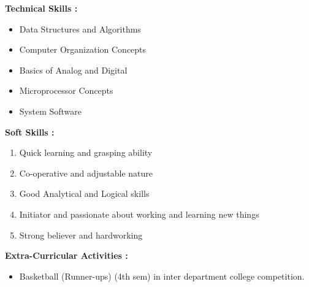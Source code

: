 \documentclass[11pt,a4paper]{article}
\begin{document}
\newpage
\begin{multicols}{3}
	\begin{minipage}{0.15\paperwidth}
		\textbf{Technical\linebreak
		Skills : }
	\end{minipage}
	\begin{minipage}{0.35\paperwidth}
		\begin{flushleft}
		\begin{itemize}
			\item Data Structures and Algorithms
			\item Computer Organization\linebreak
			Concepts
		\end{itemize}
	\end{flushleft}
	\end{minipage}
	\begin{flushright}
	\begin{minipage}{0.35\paperwidth}
		\begin{flushleft}
		\begin{itemize}
			\item Basics of Analog and Digital
			\item Microprocessor Concepts
			\item System Software
		\end{itemize}
		\end{flushleft}
	\end{minipage}
	\end{flushright}
\end{multicols}
\hfill
\begin{multicols}{2}
	\begin{minipage}{0.15\paperwidth}
		\textbf{Soft Skills :}
	\end{minipage}
	\begin{minipage}{0.7\paperwidth}
		\begin{enumerate}
			\item Quick learning and grasping ability
			\item Co-operative and adjustable nature
			\item Good Analytical and Logical skills
			\item Initiator and passionate about working and learning new things
			\item Strong believer and hardworking
		\end{enumerate}
	\end{minipage}
\end{multicols}
\hfill
\begin{multicols}{2}
	\begin{minipage}{0.15\paperwidth}
		\textbf{Extra-Curricular\linebreak
		Activities :}
	\end{minipage}
	\begin{minipage}{0.7\paperwidth}
		\begin{itemize}
			\item Basketball (Runner-ups) (4th sem) in inter department college competition.
		\end{itemize}
	\end{minipage}
\end{multicols}
\end{document}
